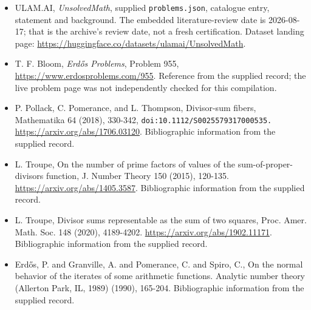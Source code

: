 \documentclass[11pt,a4paper]{article}
\begin{document}
{\small

\begin{itemize}

\item[\hypertarget{source:statement:1}{S1}] ULAM.AI, \emph{UnsolvedMath}, supplied \texttt{problems.json}, catalogue entry, statement and background. The embedded literature-review date is 2026-08-17; that is the archive’s review date, not a fresh certification. Dataset landing page: \url{https://huggingface.co/datasets/ulamai/UnsolvedMath}.

\item[\hypertarget{source:statement:2}{S2}] T. F. Bloom, \emph{Erdős Problems}, Problem 955, \url{https://www.erdosproblems.com/955}. Reference from the supplied record; the live problem page was not independently checked for this compilation.

\item[\hypertarget{source:statement:3}{S3}] P. Pollack, C. Pomerance, and L. Thompson, Divisor-sum fibers, Mathematika 64 (2018), 330-342, \nolinkurl{doi:10.1112/S0025579317000535.} \url{https://arxiv.org/abs/1706.03120}. Bibliographic information from the supplied record.

\item[\hypertarget{source:statement:4}{S4}] L. Troupe, On the number of prime factors of values of the sum-of-proper-divisors function, J. Number Theory 150 (2015), 120-135. \url{https://arxiv.org/abs/1405.3587}. Bibliographic information from the supplied record.

\item[\hypertarget{source:statement:5}{S5}] L. Troupe, Divisor sums representable as the sum of two squares, Proc. Amer. Math. Soc. 148 (2020), 4189-4202. \url{https://arxiv.org/abs/1902.11171}. Bibliographic information from the supplied record.

\item[\hypertarget{source:statement:6}{S6}] Erd\H{o}s, P. and Granville, A. and Pomerance, C. and Spiro, C., On the normal behavior of the iterates of some arithmetic functions. Analytic number theory (Allerton Park, IL, 1989) (1990), 165-204. Bibliographic information from the supplied record.

\end{itemize}

}

\label{end:statement}
\end{document}
